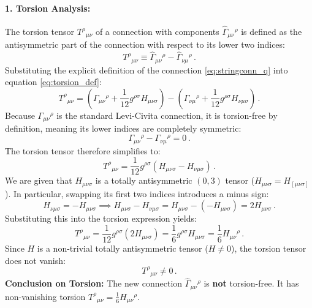\documentclass[12pt]{article}
\newcommand{\be}{\begin{equation}}
\newcommand{\ee}{\end{equation}}
\begin{document}
\paragraph{1. Torsion Analysis:}
The torsion tensor $T^\rho{}_{\mu\nu}$ of a connection with components $\hat\Gamma_{\mu\nu}{}^\rho$ is defined as the antisymmetric part of the connection with respect to its lower two indices:
\be
T^\rho{}_{\mu\nu} \equiv \hat\Gamma_{\mu\nu}{}^\rho - \hat\Gamma_{\nu\mu}{}^\rho \,.
\label{eq:torsion_def}
\ee
Substituting the explicit definition of the connection \eqref{eq:stringconn_q} into equation \eqref{eq:torsion_def}:
\be
T^\rho{}_{\mu\nu} = \left( \Gamma_{\mu\nu}{}^\rho + \frac{1}{12} g^{\rho\sigma} H_{\mu\nu\sigma} \right) - \left( \Gamma_{\nu\mu}{}^\rho + \frac{1}{12} g^{\rho\sigma} H_{\nu\mu\sigma} \right) \,.
\ee
Because $\Gamma_{\mu\nu}{}^\rho$ is the standard Levi-Civita connection, it is torsion-free by definition, meaning its lower indices are completely symmetric:
\be
\Gamma_{\mu\nu}{}^\rho - \Gamma_{\nu\mu}{}^\rho = 0 \,.
\ee
The torsion tensor therefore simplifies to:
\be
T^\rho{}_{\mu\nu} = \frac{1}{12} g^{\rho\sigma} \left( H_{\mu\nu\sigma} - H_{\nu\mu\sigma} \right) \,.
\ee
We are given that $H_{\mu\nu\sigma}$ is a totally antisymmetric $(0,3)$ tensor ($H_{\mu\nu\sigma} = H_{[\mu\nu\sigma]}$). In particular, swapping its first two indices introduces a minus sign:
\be
H_{\nu\mu\sigma} = - H_{\mu\nu\sigma} \implies H_{\mu\nu\sigma} - H_{\nu\mu\sigma} = H_{\mu\nu\sigma} - (-H_{\mu\nu\sigma}) = 2 H_{\mu\nu\sigma} \,.
\ee
Substituting this into the torsion expression yields:
\be
T^\rho{}_{\mu\nu} = \frac{1}{12} g^{\rho\sigma} \left( 2 H_{\mu\nu\sigma} \right) = \frac{1}{6} g^{\rho\sigma} H_{\mu\nu\sigma} = \frac{1}{6} H_{\mu\nu}{}^\rho \,.
\ee
Since $H$ is a non-trivial totally antisymmetric tensor ($H \neq 0$), the torsion tensor does not vanish:
\be
T^\rho{}_{\mu\nu} \neq 0 \,.
\ee
\textbf{Conclusion on Torsion:} The new connection $\hat\Gamma_{\mu\nu}{}^\rho$ is \textbf{not} torsion-free. It has non-vanishing torsion $T^\rho{}_{\mu\nu} = \frac{1}{6} H_{\mu\nu}{}^\rho$.
\end{document}
